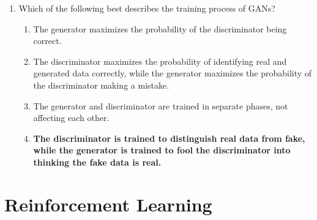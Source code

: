 \documentclass{report}
\numberwithin{equation}{section}
\begin{document}
\begin{enumerate}
\item Which of the following best describes the training process of GANs?
\begin{enumerate}[label=\alph*.]
    \item The generator maximizes the probability of the discriminator being correct.
    \item The discriminator maximizes the probability of identifying real and generated data correctly, while the generator maximizes the probability of the discriminator making a mistake.
    \item The generator and discriminator are trained in separate phases, not affecting each other.
    \item \textbf{The discriminator is trained to distinguish real data from fake, while the generator is trained to fool the discriminator into thinking the fake data is real.}
\end{enumerate}
\end{enumerate}

\section{Reinforcement Learning}
\end{document}

